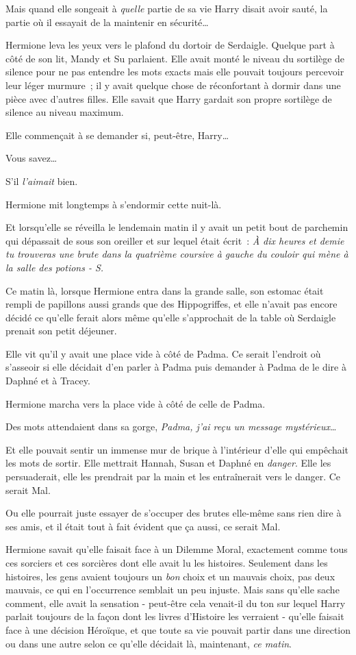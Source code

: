 Mais quand elle songeait à \emph{quelle} partie de sa vie Harry disait avoir sauté, la partie où il essayait de la maintenir en sécurité…

Hermione leva les yeux vers le plafond du dortoir de Serdaigle. Quelque part à côté de son lit, Mandy et Su parlaient. Elle avait monté le niveau du sortilège de silence pour ne pas entendre les mots exacts mais elle pouvait toujours percevoir leur léger murmure~; il y avait quelque chose de réconfortant à dormir dans une pièce avec d'autres filles. Elle savait que Harry gardait son propre sortilège de silence au niveau maximum.

Elle commençait à se demander si, peut-être, Harry…

Vous savez…

S'il \emph{l'aimait} bien.

Hermione mit longtemps à s'endormir cette nuit-là.

Et lorsqu'elle se réveilla le lendemain matin il y avait un petit bout de parchemin qui dépassait de sous son oreiller et sur lequel était écrit~: \emph{À dix heures et demie tu trouveras une brute dans la quatrième coursive à gauche du couloir qui mène à la salle des potions - S.}

\later

Ce matin là, lorsque Hermione entra dans la grande salle, son estomac était rempli de papillons aussi grands que des Hippogriffes, et elle n'avait pas encore décidé ce qu'elle ferait alors même qu'elle s'approchait de la table où Serdaigle prenait son petit déjeuner.

Elle vit qu'il y avait une place vide à côté de Padma. Ce serait l'endroit où s'asseoir si elle décidait d'en parler à Padma puis demander à Padma de le dire à Daphné et à Tracey.

Hermione marcha vers la place vide à côté de celle de Padma.

Des mots attendaient dans sa gorge, \emph{Padma, j'ai reçu un message mystérieux}…

Et elle pouvait sentir un immense mur de brique à l'intérieur d'elle qui empêchait les mots de sortir. Elle mettrait Hannah, Susan et Daphné en \emph{danger}. Elle les persuaderait, elle les prendrait par la main et les entraînerait vers le danger. Ce serait Mal.

Ou elle pourrait juste essayer de s'occuper des brutes elle-même sans rien dire à ses amis, et il était tout à fait évident que ça aussi, ce serait Mal.

Hermione savait qu'elle faisait face à un Dilemme Moral, exactement comme tous ces sorciers et ces sorcières dont elle avait lu les histoires. Seulement dans les histoires, les gens avaient toujours un \emph{bon} choix et un mauvais choix, pas deux mauvais, ce qui en l'occurrence semblait un peu injuste. Mais sans qu'elle sache comment, elle avait la sensation - peut-être cela venait-il du ton sur lequel Harry parlait toujours de la façon dont les livres d'Histoire les verraient - qu'elle faisait face à une décision Héroïque, et que toute sa vie pouvait partir dans une direction ou dans une autre selon ce qu'elle décidait là, maintenant, \emph{ce matin}.

